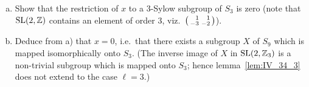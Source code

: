 \begin{enumerate}
\begin{enumerate}[a)]
	\item Show that the restriction of $x$ to a 3-Sylow subgroup of $S_3$
		is zero (note that $\operatorname{SL}(2, \mathbb{Z})$ contains an element of order 3,
		viz.\ 
		$\begin{psmallmatrix}
			\phantom{-}1 & \phantom{-}1 \\
			-3 & -2
		\end{psmallmatrix}$).
	\item Deduce from a) that $x = 0$, i.e.\ that there exists a subgroup
		$X$ of $S_9$ which is mapped isomorphically onto $S_3$.
		(The inverse image of $X$ in $\operatorname{SL}(2, \mathbb{Z}_3)$ is a non-trivial
		subgroup which is mapped onto $S_3$; hence
		lemma~\ref{lem:IV_34_3} does not extend to
		the case $\ell = 3$.)
\end{enumerate}
\end{enumerate}

